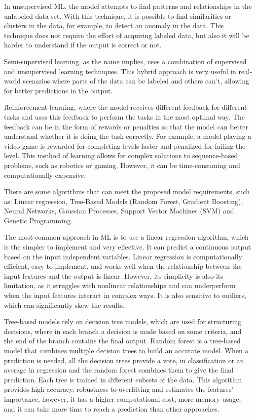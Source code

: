 In unsupervised ML, the model attempts to find patterns and relationships in the unlabeled data set. With this technique, it is possible to find similarities or clusters in the data, for example, to detect an anomaly in the data. This technique does not require the effort of acquiring labeled data, but also it will be harder to understand if the output is correct or not.

Semi-supervised learning, as the name implies, uses a combination of supervised and unsupervised learning techniques. This hybrid approach is very useful in real-world scenarios where parts of the data can be labeled and others can't, allowing for better predictions in the output.

Reinforcement learning, where the model receives different feedback for different tasks and uses this feedback to perform the tasks in the most optimal way. The feedback can be in the form of rewards or penalties so that the model can better understand whether it is doing the task correctly. For example, a model playing a video game is rewarded for completing levels faster and penalized for failing the level. This method of learning allows for complex solutions to sequence-based problems, such as robotics or gaming. However, it can be time-consuming and computationally expensive.

There are some algorithms that can meet the proposed model requirements, such as: Linear regression, Tree-Based Models (Random Forest, Gradient Boosting), Neural Networks, Gaussian Processes, Support Vector Machines (SVM) and Genetic Programming.

The most common approach in ML is to use a linear regression algorithm, which is the simpler to implement and very effective. It can predict a continuous output based on the input independent variables. Linear regression is computationally efficient, easy to implement, and works well when the relationship between the input features and the output is linear. However, its simplicity is also its limitation, as it struggles with nonlinear relationships and can underperform when the input features interact in complex ways. It is also sensitive to outliers, which can significantly skew the results.

Tree-based models rely on decision tree models, which are used for structuring decisions, where in each branch a decision is made based on some criteria, and the end of the branch contains the final output. Random forest is a tree-based model that combines multiple decision trees to build an accurate model. When a prediction is needed, all the decision trees provide a vote, in classification or an average in regression and the random forest combines them to give the final prediction. Each tree is trained in different subsets of the data. This algorithm provides high accuracy, robustness to overfitting and estimates the features' importance, however, it has a higher computational cost, more memory usage, and it can take more time to reach a prediction than other approaches.

